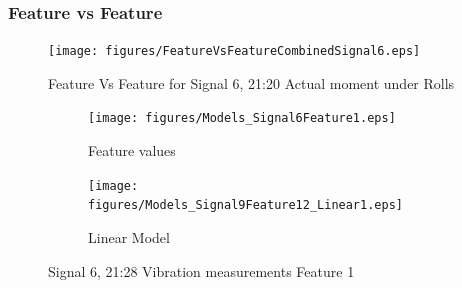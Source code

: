 \documentclass[]{article}
\begin{document}
\subsubsection*{Feature vs Feature}


\begin{figure}[H]
    \centering
    \texttt{[image: figures/FeatureVsFeatureCombinedSignal6.eps]}
    \caption{Feature Vs Feature for Signal 6, 21:20 Actual moment under Rolls}
    \label{fig:FeatureVsFeatureCombinedSignal6}
\end{figure}

\begin{figure}[H]
    \centering
		\begin{subfigure}{.5\textwidth}
		  \centering
    			\texttt{[image: figures/Models\_Signal6Feature1.eps]}
		  	\caption{Feature values}
		  	\label{fig:Models_Signal6Feature1}
		\end{subfigure}%
		\begin{subfigure}{.5\textwidth}
		  \centering
 		   	\texttt{[image: figures/Models\_Signal9Feature12\_Linear1.eps]}
		  	\caption{Linear Model}
		  	\label{fig:Models_Signal6Feature1_Linear1}
		\end{subfigure}
    \caption{Signal 6, 21:28 Vibration measurements Feature 1}
    \label{fig:Models_Signal6Feature1_Caption}
\end{figure}
\end{document}
